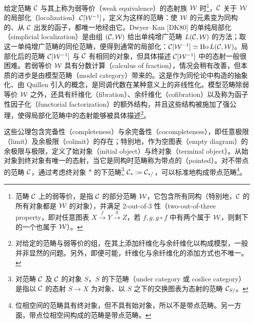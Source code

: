 给定范畴 $\mathcal{C}$ 与其上称为弱等价（weak equivalence）的态射族 $\mathcal{W}$ 时\footnote{范畴 $\mathcal{C}$ 上的弱等价，是指 $\mathcal{C}$ 的部分范畴 $\mathcal{W}$，它包含所有同构（特别地，$\mathcal{C}$ 的所有对象都是 $\mathcal{W}$ 的对象），并满足 2-out-of-3 性（two-out-of-three property，即对任意图表 $X\xrightarrow{f}Y\xrightarrow{g}Z$，若 $f,g,g\circ f$ 中有两个属于 $\mathcal{W}$，则剩下的一个也属于 $\mathcal{W}$）。}，$\mathcal{C}$ 关于 $\mathcal{W}$ 的局部化（localization）$\mathcal{C}[\mathcal{W}^{-1}]$，定义为这样的范畴：使 $\mathcal{W}$ 的元素变为同构的、从 $\mathcal{C}$ 出发的函子，都唯一地经由它。Dwyer–Kan [DK80] 的单纯局部化（simplicial localization）是由组 $(\mathcal{C},\mathcal{W})$ 给出单纯增广范畴 $L(\mathcal{C},\mathcal{W})$ 的方法；取这一单纯增广范畴的同伦范畴，便得到通常的局部化：$\mathcal{C}[\mathcal{W}^{-1}]\simeq\operatorname{Ho}L(\mathcal{C},\mathcal{W})$。局部化后的范畴 $\mathcal{C}[\mathcal{W}^{-1}]$ 与 $\mathcal{C}$ 有相同的对象，但具体描述 $\mathcal{C}[\mathcal{W}^{-1}]$ 中的态射一般很困难。若弱等价 $\mathcal{W}$ 具有分数计算（calculus of fraction），情况会稍有改善，但本质的进步是由模型范畴（model category）带来的。这是作为同伦论中构造的抽象化、由 Quillen 引入的概念，是同调代数在某种意义上的非线性化。模型范畴除弱等价 $\mathcal{W}$ 之外，还具有纤维化（fibration）、余纤维化（cofibration）以及称为函子性因子化（functorial factorization）的额外结构，并且这些结构被施加了强公理，使得局部化范畴中的态射能够被具体描述\footnote{对给定的范畴与弱等价的组，在其上添加纤维化与余纤维化以构成模型，一般并非显然的问题。另外，即便可能，纤维化与余纤维化的添加方式也不唯一。}。

这些公理包含完备性（completeness）与余完备性（cocompleteness），即任意极限（limit）及余极限（colimit）的存在；特别地，作为空图表（empty diagram）的余极限与极限，定义了始对象（initial object）与终对象（terminal object）。从始对象到终对象有唯一的态射，当它是同构时范畴称为带点的（pointed）。对不带点的范畴 $\mathcal{C}$，通过考虑终对象 $\ast$ 的下范畴\footnote{对范畴 $\mathcal{C}$ 及 $\mathcal{C}$ 的对象 $S$，$S$ 的下范畴（under category 或 coslice category）是指以 $\mathcal{C}$ 的态射 $S\to X$ 为对象、以 $S$ 之下的交换图表为态射的范畴 $\mathcal{C}_{S/}$。} $\mathcal{C}_{\ast}:=\mathcal{C}_{\ast/}$，可以标准地构成带点范畴\footnote{位相空间的范畴具有终对象，但不具有始对象，所以不是带点范畴。另一方面，带点位相空间构成的范畴是带点范畴。}。



